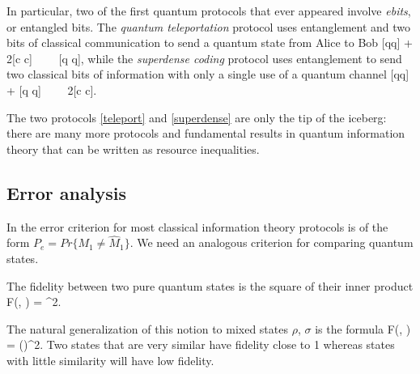 \documentclass[aps,11pt,twoside,letterpaper]{article}
\begin{document}
            In particular, two of the first quantum protocols that ever appeared involve \emph{ebits}, 
            or entangled bits.  
            The \emph{quantum teleportation} protocol \cite{teleportation} uses entanglement and two bits of classical
            communication to send a quantum state from Alice to Bob
            \be	{}	\label{teleport}
                [qq] + 2[c \to c]	\ \ \geq \ \ 	[q \to q],
            \ee
            while the \emph{superdense coding} protocol \cite{superdense} uses entanglement to send two classical
            bits of information with only a single use of a quantum channel
            \be	{}	\label{superdense}
                [qq] + [q \to q]	\ \ \geq \ \ 	2[c \to c].
            \ee

            The two protocols \eqref{teleport} and \eqref{superdense} are only the tip of the iceberg: 
            there are many more protocols and fundamental results in quantum information theory that can be 
            written as resource inequalities.
                        
			

		\bigskip		
		\subsection{Error analysis}		\label{subsection:distance-measures}
    
            In the error criterion for most classical information theory protocols is of the form 
            $P_e = Pr\{ M_1 \neq \hat{M}_1 \}$.
            We need an analogous criterion for comparing quantum states.

			The fidelity between two pure  quantum states is the square of their inner product
			\be
				F(\ket{\varphi}, \ket{\psi}) = \left\vert \braket{\varphi}{\psi} \right\vert^2.
			\ee
			
			The natural generalization of this notion to mixed states $\rho$, $\sigma$ is
			the formula
	    	\be
	    		F(\rho, \sigma) = \left(\sqrt{\sqrt{\rho}\sigma\sqrt{\rho}}\right)^2.
	    	\ee
		    Two states that are very similar have fidelity close to 1 whereas states with little similarity 
		    will have low fidelity.
		    
\end{document}
